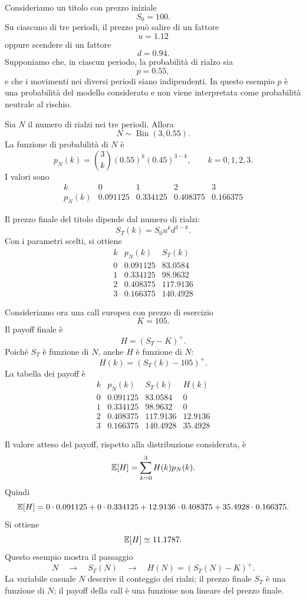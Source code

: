 \begin{example}

Consideriamo un titolo con prezzo iniziale
\[
S_0=100.
\]
Su ciascuno di tre periodi, il prezzo pu\`{o} salire di un fattore
\[
u=1.12
\]
oppure scendere di un fattore
\[
d=0.94.
\]
Supponiamo che, in ciascun periodo, la probabilit\`{a} di rialzo sia
\[
p=0.55,
\]
e che i movimenti nei diversi periodi siano indipendenti. In questo esempio $p$
\`{e} una probabilit\`{a} del modello considerato e non viene interpretata come
probabilit\`{a} neutrale al rischio.

Sia $N$ il numero di rialzi nei tre periodi. Allora
\[
N\sim \operatorname{Bin}(3,0.55).
\]
La funzione di probabilit\`{a} di $N$ \`{e}
\[
p_N(k)
=
\binom{3}{k}(0.55)^k(0.45)^{3-k},
\qquad
k=0,1,2,3.
\]
I valori sono
\[
\begin{array}{c|cccc}
k & 0 & 1 & 2 & 3\\
\hline
p_N(k) & 0.091125 & 0.334125 & 0.408375 & 0.166375
\end{array}
\]

Il prezzo finale del titolo dipende dal numero di rialzi:
\[
S_T(k)=S_0u^k d^{3-k}.
\]
Con i parametri scelti, si ottiene
\[
\begin{array}{c|c|c}
k & p_N(k) & S_T(k)\\
\hline
0 & 0.091125 & 83.0584\\
1 & 0.334125 & 98.9632\\
2 & 0.408375 & 117.9136\\
3 & 0.166375 & 140.4928
\end{array}
\]

Consideriamo ora una call europea con prezzo di esercizio
\[
K=105.
\]
Il payoff finale \`{e}
\[
H=(S_T-K)^+.
\]
Poich\'{e} $S_T$ \`{e} funzione di $N$, anche $H$ \`{e} funzione di $N$:
\[
H(k)=(S_T(k)-105)^+.
\]
La tabella dei payoff \`{e}
\[
\begin{array}{c|c|c|c}
k & p_N(k) & S_T(k) & H(k)\\
\hline
0 & 0.091125 & 83.0584 & 0\\
1 & 0.334125 & 98.9632 & 0\\
2 & 0.408375 & 117.9136 & 12.9136\\
3 & 0.166375 & 140.4928 & 35.4928
\end{array}
\]

Il valore atteso del payoff, rispetto alla distribuzione considerata, \`{e}
\[
\mathbb{E}[H]
=
\sum_{k=0}^3 H(k)p_N(k).
\]
Quindi
\[
\mathbb{E}[H]
=
0\cdot 0.091125
+
0\cdot 0.334125
+
12.9136\cdot 0.408375
+
35.4928\cdot 0.166375.
\]
Si ottiene
\[
\mathbb{E}[H]\simeq 11.1787.
\]
Questo esempio mostra il passaggio
\[
N
\quad\longrightarrow\quad
S_T(N)
\quad\longrightarrow\quad
H(N)=(S_T(N)-K)^+.
\]
La variabile casuale $N$ descrive il conteggio dei rialzi; il prezzo finale
$S_T$ \`{e} una funzione di $N$; il payoff della call \`{e} una funzione non
lineare del prezzo finale.
\end{example}

